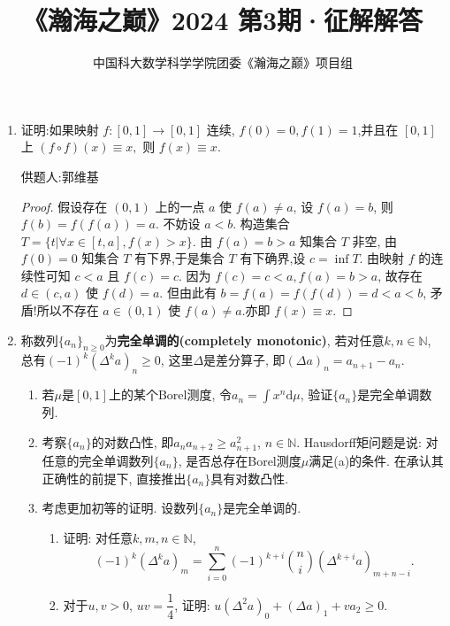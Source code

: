 \documentclass[lang=cn,12pt,a4paper]{elegantpaper}
\title{《瀚海之巅》2024 第3期·征解解答}
\author{中国科大数学科学学院团委\quad《瀚海之巅》项目组}
\date{\zhtoday}
\begin{document}
\maketitle
\begin{enumerate}
	\item 证明:如果映射 $f:[0,1]\rightarrow[0,1]$ 连续, $f(0)=0,f(1)=1$,并且在 $[0,1]$ 上 $(f\circ f)(x)\equiv x,$ 则 $f(x)\equiv x.$
	
	\begin{flushright}
		\kaishu
		供题人:郭维基
	\end{flushright}
	
	\begin{proof}
		假设存在 $(0,1)$ 上的一点 $a$ 使 $f(a)\neq a$, 设 $f(a)=b$, 则 $f(b)=f(f(a))=a$. 不妨设 $a<b$. 构造集合 $T=\{t|\forall x\in[t,a],f(x)>x\}$. 由 $f(a)=b>a$ 知集合 $T$ 非空, 由 $f(0)=0$ 知集合 $T$ 有下界,于是集合 $T$ 有下确界,设 $c=\inf T$. 由映射 $f$ 的连续性可知 $c<a$ 且 $f(c)=c$. 因为 $f(c)=c<a,f(a)=b>a$, 故存在 $d\in(c,a)$ 使 $f(d)=a$. 但由此有 $b=f(a)=f(f(d))=d<a<b$, 矛盾!所以不存在 $a\in(0,1)$ 使 $f(a)\neq a$.亦即 $f(x)\equiv x$.
	\end{proof}
	
	
	\item 称数列$\{a_n\}_{n\geq 0}$为\textbf{完全单调的(completely monotonic)}, 若对任意$k,n\in\mathbb N$, 总有$(-1)^k(\Delta^k a)_n\geq 0$, 这里$\Delta$是差分算子, 即$(\Delta a)_n=a_{n+1}-a_n$.
	
	\begin{enumerate}
		\item 若$\mu$是$[0,1]$上的某个Borel测度, 令$a_n=\int x^n\mathrm{d}\mu$, 验证$\{a_n\}$是完全单调数列.

		\item 考察$\{a_n\}$的对数凸性, 即$a_na_{n+2}\geq a_{n+1}^2$, $n\in\mathbb N$. Hausdorff矩问题是说: 对任意的完全单调数列$\{a_n\}$, 是否总存在Borel测度$\mu$满足(a)的条件. 在承认其正确性的前提下, 直接推出$\{a_n\}$具有对数凸性.

		\item 考虑更加初等的证明. 设数列$\{a_n\}$是完全单调的.

		\begin{enumerate}[i]
			\item 证明: 对任意$k,m,n\in \mathbb N$, \[(-1)^k(\Delta^k a)_m=\sum_{i=0}^{n}(-1)^{k+i}\binom{n}{i}(\Delta^{k+i}a)_{m+n-i}.\]

			\item 对于$u,v>0$, $uv=\dfrac{1}{4}$, 证明: $u(\Delta^2 a)_0+(\Delta a)_1+va_2\geq0$.


\end{enumerate}
\end{enumerate}
\end{enumerate}
\end{document}
